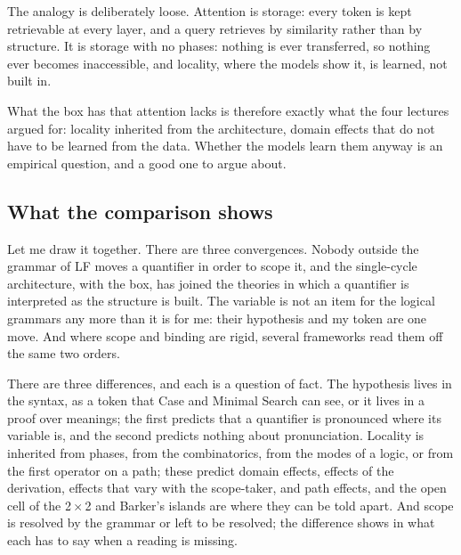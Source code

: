 \documentclass[
  layout=tufte,           %
  twoside=false, open=any,
  font=pagella,
  chapterprefix=false,
  numbers=noendperiod,    %
  headings=optiontohead,  %
  parskip=half-,          %
  colorlinks=true,
  examples=gb4e,
  minsyn=true,            %
  bib=natbib, bibstyle=glossa, bibfile=keio,
  greek=false,
]{gtbook}
\makeatletter
\def\keio@pfx{}
\let\keio@label\label
\renewcommand\label[1]{\keio@label{\keio@pfx#1}}%
\makeatother
\begin{document}
\begin{excursus}
The analogy is deliberately loose. Attention is storage: every token is kept retrievable at every layer, and a query retrieves by similarity rather than by structure. It is storage with no phases: nothing is ever transferred, so nothing ever becomes inaccessible, and locality, where the models show it, is learned, not built in.

\begin{center}
\end{center}

What the box has that attention lacks is therefore exactly what the four lectures argued for: locality inherited from the architecture, domain effects that do not have to be learned from the data. Whether the models learn them anyway is an empirical question, and a good one to argue about.
\end{excursus}

\subsection{What the comparison shows}\label{sec:nb-summary}

Let me draw it together. There are three convergences. Nobody outside the grammar of LF moves a quantifier in order to scope it, and the single-cycle architecture, with the box, has joined the theories in which a quantifier is interpreted as the structure is built. The variable is not an item for the logical grammars any more than it is for me: their hypothesis and my token are one move. And where scope and binding are rigid, several frameworks read them off the same two orders.

There are three differences, and each is a question of fact. The hypothesis lives in the syntax, as a token that Case and Minimal Search can see, or it lives in a proof over meanings; the first predicts that a quantifier is pronounced where its variable is, and the second predicts nothing about pronunciation. Locality is inherited from phases, from the combinatorics, from the modes of a logic, or from the first operator on a path; these predict domain effects, effects of the derivation, effects that vary with the scope-taker, and path effects, and the open cell of the 2\,$\times$\,2 and Barker's islands are where they can be told apart. And scope is resolved by the grammar or left to be resolved; the difference shows in what each has to say when a reading is missing.
\end{document}
